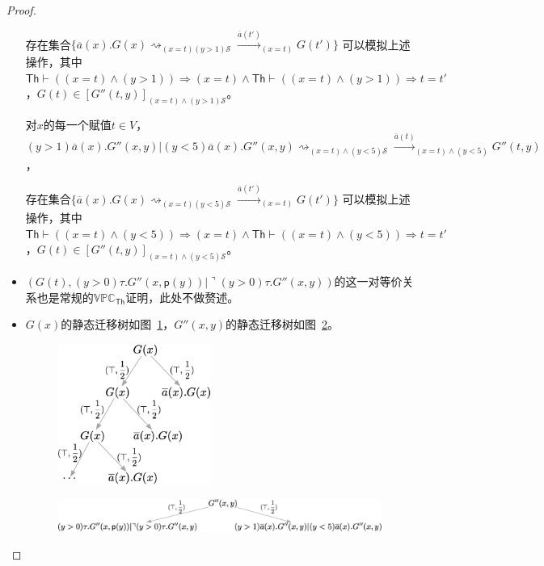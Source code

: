 \begin{proof}
\begin{itemize}
{\begin{itemize}
{               存在集合$\{\overline{a}(x).G(x)\rightsquigarrow_{(x=t)(y>1)\mathcal{S}}\stackrel{\overline{a}(t')}{\longrightarrow}_{(x=t)}G(t')\}$
               可以模拟上述操作，其中$\mathsf{Th}\vdash ((x=t)\wedge (y>1))\Rightarrow (x=t) \wedge \mathsf{Th}\vdash ((x=t)\wedge (y>1))\Rightarrow t=t'$，$G(t)\in [G''(t,y)]_{(x=t)\wedge (y>1)\mathcal{S}}$。
               
               对$x$的每一个赋值$t\in V$，
               $$(y>1)\overline{a}(x).G''(x,y)|(y<5)\overline{a}(x).G''(x,y)\rightsquigarrow_{(x=t)\wedge(y<5)\mathcal{S}}\stackrel{\overline{a}(t)}{\rightarrow}_{(x=t)\wedge(y<5)}G''(t,y)$$，
               
               存在集合$\{\overline{a}(x).G(x)\rightsquigarrow_{(x=t)(y<5)\mathcal{S}}\stackrel{\overline{a}(t')}{\longrightarrow}_{(x=t)}G(t')\}$
               可以模拟上述操作，其中$\mathsf{Th}\vdash ((x=t)\wedge (y<5))\Rightarrow (x=t) \wedge\mathsf{Th}\vdash ((x=t)\wedge (y<5))\Rightarrow t=t'$，$G(t)\in [G''(t,y)]_{(x=t)\wedge (y<5)\mathcal{S}}$。
            }
         \end{itemize}
      }
      \item {
         $(G(t),(y>0)\tau.G''(x,\mathsf{p}(y))|\urcorner (y>0)\tau.G''(x,y))$的这一对等价关系也是常规的$\mathbb{VPC}_{\mathsf{Th}}$证明，此处不做赘述。
      }
      \item {
         $G(x)$的静态迁移树如图~\ref{fig_eg4_1}，$G''(x,y)$的静态迁移树如图~\ref{fig_eg4_2}。
         \begin{figure}[!htbp]
            \caption[]{}
            \small
            \centering
            \includegraphics[width=5cm]{../figures/example1.png}
             \label{fig_eg4_1}
         \end{figure}
         \begin{figure}[!htbp]
            \caption[]{}
            \small
            \centering
            \includegraphics[width=13cm]{../figures/example4_2.png}
             \label{fig_eg4_2}
         \end{figure}

}
\end{itemize}
\end{proof}
